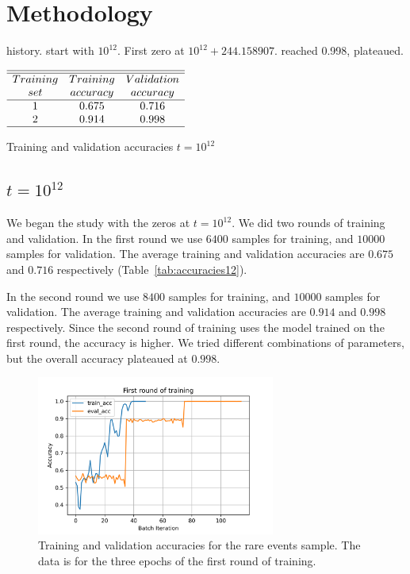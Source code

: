 \documentclass[journal]{IEEEtai}
\begin{document}
\section{Methodology}

history. start with $10^{12}$. First zero   at $10^{12} + 244.158907$. reached 0.998, plateaued. 


\begin{table}
\centering \(\begin{array}{ccc}
\hline
\hline
Training  & Training &Validation  \\
set     &accuracy&accuracy\\
\hline
1  & 0.675 & 0.716 \\

2  & 0.914 & 0.998 \\
\hline
\end{array}\)
\caption{Training and validation accuracies $t=10^{12}$}
\label{tab:accuracies12}
\end{table}

\subsection{\label{10E12} $t=10^{12}$}

We began the study with the zeros at $t=10^{12}$.
We did two rounds of training and validation. In the first round we use $6400$ samples for training, and $10000$ samples for validation.   The average training and validation accuracies are $0.675$ and $0.716$ respectively (Table~\ref{tab:accuracies12}).

In the second round we use $8400$ samples for training, and $10000$ samples for validation. The average training and validation accuracies are $0.914$ and $0.998$ respectively. Since the second round of training uses the model trained on the first round, the accuracy is higher. We tried different combinations of parameters, but the overall accuracy plateaued at $0.998$.


\begin{figure}
\centerline{\includegraphics[width=18.5pc]{Figure1.png}}
\caption{Training and validation accuracies for the rare events sample. The data is for 
the three epochs of the first round of training.}
\end{figure}
\end{document}
